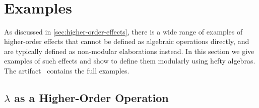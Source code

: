 \begin{code}[hide]
\AgdaSpace{}%
\AgdaSpace{}%
\AgdaSymbol{(}\AgdaSymbol{;}\AgdaSpace{}%
\AgdaInductiveConstructor{[]}\AgdaSymbol{;}\AgdaSpace{}%
\AgdaSymbol{;}\AgdaSpace{}%
\AgdaOperator{\AgdaFunction{\AgdaUnderscore{}++\AgdaUnderscore{}}}\AgdaSymbol{;}\AgdaSpace{}%
\AgdaSymbol{)}\<%
\\
\>[0]\AgdaSpace{}%
\AgdaSpace{}%
\<%
\\
\>[0]\AgdaSpace{}%
\AgdaSpace{}%
\AgdaSpace{}%
\AgdaSpace{}%
\AgdaSymbol{(}\AgdaSymbol{)}\<%
\\
\>[0]\AgdaSpace{}%
\AgdaSpace{}%
\AgdaSpace{}%
\AgdaSpace{}%
\AgdaSymbol{(}\AgdaOperator{\AgdaInductiveConstructor{[\AgdaUnderscore{}]}}\AgdaSymbol{)}\<%
\\
\>[0]\<%
\end{code}

\section{Examples}
\label{sec:examples}

As discussed in \cref{sec:higher-order-effects}, there is a wide range of examples of higher-order effects that cannot be defined as algebraic operations directly, and are typically defined as non-modular elaborations instead.
In this section we give examples of such effects and show to define them modularly using hefty algebras.
The artifact~\citep{artifact} contains the full examples.


\subsection{$\lambda$ as a Higher-Order Operation}
\label{sec:higher-order-lambda}

